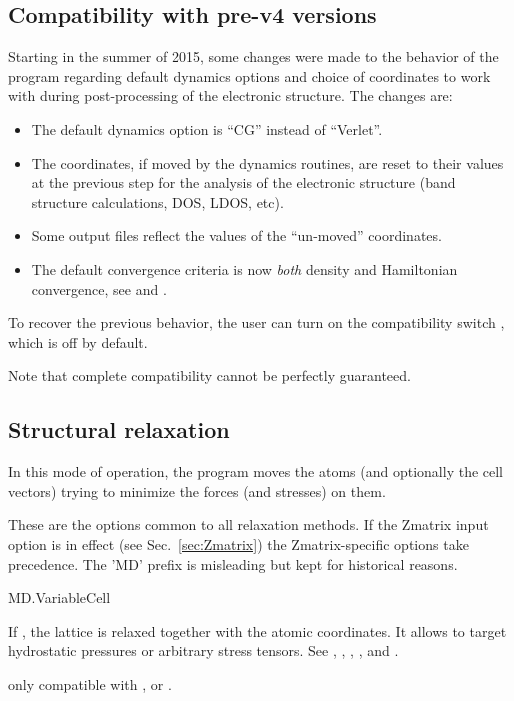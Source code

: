 \subsection{Compatibility with pre-v4 versions}

Starting in the summer of 2015, some changes were made to the behavior
of the program regarding default dynamics options and choice of
coordinates to work with during post-processing of the electronic
structure. The changes are:

\begin{itemize}
  \item %
  The default dynamics option is ``CG'' instead of ``Verlet''.

  \item%
  The coordinates, if moved by the dynamics routines, are reset to
  their values at the previous step for the analysis of the electronic 
  structure (band structure calculations, DOS, LDOS, etc).

  \item%
  Some output files reflect the values of the ``un-moved''
  coordinates.

  \item%
  The default convergence criteria is now \emph{both} density and
  Hamiltonian convergence, see  and
  .

\end{itemize}

To recover the previous behavior, the user can turn on the
compatibility switch , which is off by
default.

Note that complete compatibility cannot be perfectly guaranteed.

\subsection{Structural relaxation}

In this mode of operation, the program moves the atoms (and optionally
the cell vectors) trying to minimize the forces (and stresses) on
them.

These are the options common to all relaxation methods. If the Zmatrix
input option is in effect (see Sec.~\ref{sec:Zmatrix}) the
Zmatrix-specific options take precedence.  The 'MD' prefix is
misleading but kept for historical reasons.

\begin{fdflogicalF}{MD.VariableCell}

  If \fdftrue, the lattice is relaxed together with the atomic
  coordinates. It allows to target hydrostatic pressures or arbitrary
  stress tensors. See ,
  , ,
  , and
  .

  \note only compatible with ,
   or .

\end{fdflogicalF}


